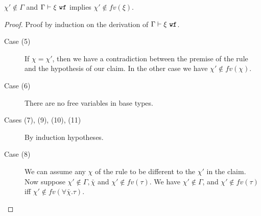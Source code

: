 \documentclass[a4paper]{article}
\begin{document}
\begin{prop}
  $\chi'\notin \Gamma$ and ${\normalfont \Gamma \vdash \xi\ \texttt{wf}}$ implies $\chi'\notin fv(\xi)$.
  \label{prop:cwffvty}
\end{prop}
\begin{proof}
  Proof by induction on the derivation of ${\normalfont \Gamma \vdash \xi\ \texttt{wf}}$.
  \begin{description}

    \item[Case (5)] If $\chi = \chi'$, then we have a contradiction between the
      premise of the rule and the hypothesis of our claim. In the other case
      we have $\chi'\notin fv(\chi)$.

    \item[Case (6)] There are no free variables in base types. 

    \item[Cases (7), (9), (10), (11)] By induction hypotheses.

    \item[Case (8)] We can assume any $\chi$ of the rule to be different to the
      $\chi'$ in the claim. Now suppose $\chi'\notin \Gamma,\bar{\chi}$ and $\chi'\notin fv(\tau)$. We have
      $\chi'\notin \Gamma$, and $\chi'\notin fv(\tau)$ iff $\chi'\notin fv(\forall\bar{\chi}.\tau)$.
  \end{description}
\end{proof}
\end{document}
